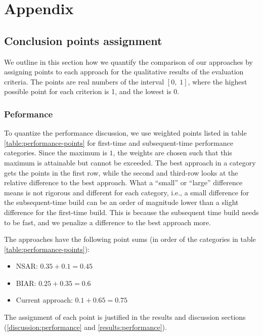 \chapter{Appendix}
\section{Conclusion points assignment}\label{appendix:conclusion-point-assignment}
We outline in this section how we quantify the comparison of our approaches by assigning points to each approach for the qualitative results of the evaluation criteria. The points are real numbers of the interval $[0,\;1]$, where the highest possible point for each criterion is 1, and the lowest is 0. 

\subsection{Peformance}
To quantize the performance discussion, we use weighted points listed in table \ref{table:performance-points} for first-time and subsequent-time performance categories. Since the maximum is $1$, the weights are chosen such that this maximum is attainable but cannot be exceeded. The best approach in a category gets the points in the first row, while the second and third-row looks at the relative difference to the best approach. What a ``small'' or ``large'' difference means is not rigorous and different for each category, i.e., a small difference for the subsequent-time build can be an order of magnitude lower than a slight difference for the first-time build. This is because the subsequent time build needs to be fast, and we penalize a difference to the best approach more. 

The approaches have the following point sums (in order of the categories in table \ref{table:performance-points}): 

\begin{itemize}
    \item NSAR: $0.35+0.1 = 0.45$
    \item BIAR: $0.25+0.35 = 0.6$
    \item Current approach: $0.1+0.65 = 0.75$
\end{itemize}
The assignment of each point is justified in the results and discussion sections (\ref{discussion:performance} and \ref{results:performance}).

